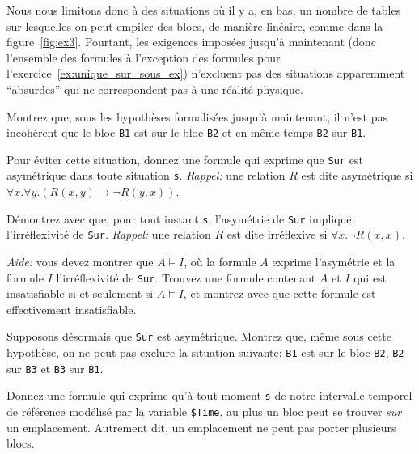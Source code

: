 Nous nous limitons donc à des situations où il y a, en bas, un nombre de
tables sur lesquelles on peut empiler des blocs, de manière linéaire, comme
dans la figure~\ref{fig:ex3}.
Pourtant, les exigences imposées jusqu'à maintenant (donc l'ensemble des
formules à l'exception des formules pour
l'exercice~\ref{ex:unique_sur_sous_ex}) n'excluent pas des situations
apparemment \enquote{absurdes} qui ne correspondent pas à une réalité physique.


\begin{exo}\label{ex:sur_asym_satisfiable}
Montrez que, sous les hypothèses formalisées jusqu'à maintenant, il n'est
  pas incohérent que le bloc \texttt{B1} est sur le bloc \texttt{B2} et en même temps
  \texttt{B2} sur \texttt{B1}.
  \end{exo}

  \begin{exo}\label{ex:sur_asym}
  Pour éviter cette situation, donnez une formule qui exprime que \texttt{Sur}
  est asymétrique dans toute situation \texttt{s}. \emph{Rappel:} une relation $R$ est dite
  asymétrique si $\forall x. \forall y. (R(x,y) \to  \lnot R(y,x))$.
\end{exo}

\begin{exo}\label{ex:sur_irrefl}
  Démontrez avec \textsc{\touist} que, pour tout instant \texttt{s}, l'asymétrie
  de \texttt{Sur} implique l'irréflexivité de \texttt{Sur}. \emph{Rappel:} une
  relation $R$ est dite irréflexive si $\forall x. \lnot R(x,x)$.

  \emph{Aide:} vous devez montrer que $A \models I$, où la formule $A$ exprime
  l'asymétrie et la formule $I$ l'irréflexivité de \texttt{Sur}. Trouvez une
  formule contenant $A$ et $I$ qui est insatisfiable si et seulement si $A
  \models I$, et montrez avec \textsc{\touist} que cette formule est
  effectivement insatisfiable.
\end{exo}



\begin{exo}\label{ex:sur_cycl}
Supposons désormais que \texttt{Sur} est asymétrique. Montrez que, même sous
  cette hypothèse, on ne peut pas exclure la situation suivante: \texttt{B1} est sur
  le bloc \texttt{B2}, \texttt{B2} sur \texttt{B3} et \texttt{B3} sur \texttt{B1}.
  \end{exo}
\begin{exo}\label{ex:unique_sur}
Donnez une formule qui exprime qu'à tout moment  \texttt{s} de notre intervalle
  temporel de référence modélisé par la variable \texttt{\$Time}, au plus un bloc peut se
  trouver \emph{sur} un emplacement. Autrement dit, un emplacement ne peut pas porter
  plusieurs blocs.
\end{exo}


